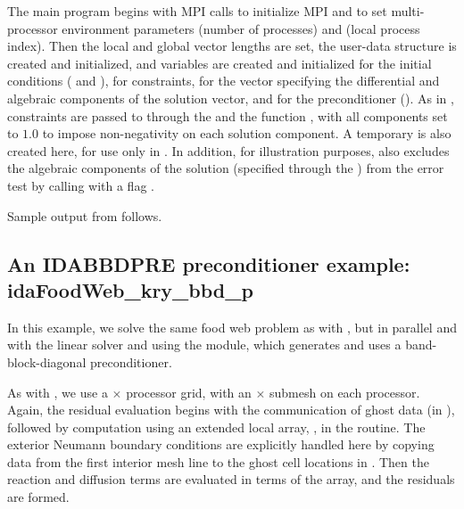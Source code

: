 The  main program begins with MPI calls to initialize MPI and to
set multi-processor environment parameters  (number of processes) and
 (local process index).  Then the local and global vector lengths are set,
the user-data structure  is created and initialized, and 
variables are created and initialized for the initial conditions ( and
), for constraints, for the vector  specifying the differential 
and algebraic components of the solution vector, and for the preconditioner
().  As in , constraints are passed to {\ida} through the
  and the function , with
all components set to $1.0$ to impose non-negativity on each solution component.
A temporary   is also created here, for use only in
.  In addition, for illustration purposes,
 also excludes the algebraic components of the solution
(specified through the  ) from the error test by calling
 with a flag .

Sample output from  follows.


\subsection{An IDABBDPRE preconditioner example: idaFoodWeb\_kry\_bbd\_p}\label{ss:idaFoodWeb_bbd_p}

In this example, we solve the same food web problem as with
, but in parallel and with the {\idaspgmr} linear solver and
using the {\idabbdpre} module, which generates and uses a band-block-diagonal 
preconditioner.

As with , we use a  $\times$  processor grid, with
an  $\times$  submesh on each processor.  Again, the residual
evaluation begins with the communication of ghost data (in ),
followed by computation using an extended local array, , in the
 routine.
The exterior Neumann boundary conditions are explicitly handled here
by copying data from the first interior mesh line to the ghost cell
locations in .  Then the reaction and diffusion terms are
evaluated in terms of the  array, and the residuals are formed.

